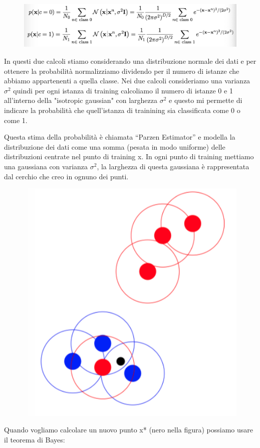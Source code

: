 \documentclass[14pt]{extreport}
\begin{document}
	\begin{figure}[H] 
		\centering
		\includegraphics[width=0.7\linewidth]{468.jpeg}
		\end{figure}

		In questi due calcoli stiamo considerando una distribuzione normale dei dati e per ottenere la probabilità normalizziamo dividendo per il numero di istanze che abbiamo appartenenti a quella classe.
		Nei due calcoli consideriamo una varianza $\sigma^2$ quindi per ogni istanza di training calcoliamo il numero di istanze 0 e 1 
		all’interno della "isotropic gaussian" con larghezza $\sigma^2$ e questo mi permette di indicare la probabilità che quell’istanza di trainining sia classificata come 0 o come 1.
		
		Questa stima della probabilità è chiamata “Parzen Estimator” e modella la distribuzione dei dati come una somma (pesata in modo uniforme) delle distribuzioni centrate nel punto di training x.
		In ogni punto di training mettiamo una gaussiana con varianza $\sigma^2$, la larghezza di questa gaussiana è rappresentata dal cerchio che creo in ognuno dei punti.



\begin{figure}[H] 
\centering
\includegraphics[width=0.7\linewidth]{469.jpeg}
\end{figure}

Quando vogliamo calcolare un nuovo punto x* (nero nella figura) possiamo usare il teorema di Bayes:
\end{document}
